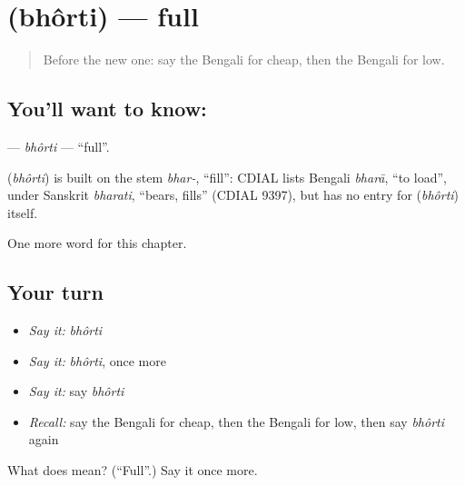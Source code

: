 \section[\texorpdfstring{\bn{ভর্তি} (bhôrti)}{ভর্তি (bhôrti)}]{ (bhôrti) — full}

\label{lesson:BN-C74-bhorti}



\begin{quote}
Before the new one: say the Bengali for cheap, then the Bengali for low.
\end{quote}

\subsection*{You'll want to know: }
\textbf{} — \emph{bhôrti} — \textquotedblleft{}full\textquotedblright{}.

\begin{cousinweb}
\textbf{} (\emph{bhôrti}) is built on the stem \emph{bhar-}, \textquotedblleft{}fill\textquotedblright{}: CDIAL lists Bengali \emph{bharā}, \textquotedblleft{}to load\textquotedblright{}, under Sanskrit \emph{bharati}, \textquotedblleft{}bears, fills\textquotedblright{} (CDIAL 9397), but has no entry for \textbf{} (\emph{bhôrti}) itself.
\end{cousinweb}

\begin{grammarlens}[title={What you've built}]
One more word for this chapter.
\end{grammarlens}

\subsection*{Your turn}
\begin{itemize}
\raggedright
  \item \emph{Say it:} \emph{bhôrti}
  \item \emph{Say it:} \emph{bhôrti}, once more
  \item \emph{Say it:} say \emph{bhôrti}
  \item \emph{Recall:} say the Bengali for cheap, then the Bengali for low, then say \emph{bhôrti} again
\end{itemize}

\begin{tcolorbox}[breakable,colback=teal!4,colframe=teal!35!black,title={Before you move on}]
What does  mean? (\textquotedblleft{}Full\textquotedblright{}.) Say it once more.
\end{tcolorbox}
